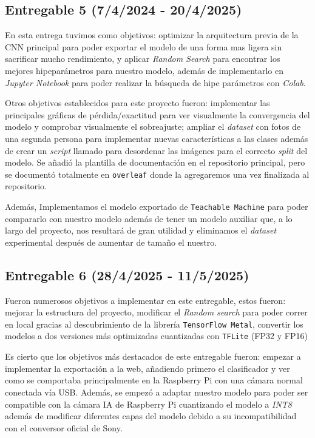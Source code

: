 \subsection{Entregable 5 (7/4/2024 - 20/4/2025)}
En esta entrega tuvimos como objetivos: optimizar la arquitectura previa de la CNN principal para poder exportar el modelo de una forma mas ligera sin sacrificar mucho rendimiento, y aplicar \textit{Random Search} para encontrar los mejores hipeparámetros para nuestro modelo, además de implementarlo en \textit{Jupyter Notebook} para poder realizar la búsqueda de hipe parámetros con \textit{Colab}. 

Otros objetivos establecidos para este proyecto fueron: implementar las principales gráficas de pérdida/exactitud para ver visualmente la convergencia del modelo y comprobar visualmente el sobreajuste; ampliar el \textit{dataset} con fotos de una segunda persona para implementar nuevas características a las clases además de crear un \textit{script} llamado para desordenar las imágenes para el correcto \textit{split} del modelo. Se añadió la plantilla de documentación en el repositorio principal, pero se documentó totalmente en \texttt{overleaf} donde la agregaremos una vez finalizada al repositorio.

Además, Implementamos el modelo exportado de \texttt{Teachable Machine} para poder compararlo con nuestro modelo además de tener un modelo auxiliar que, a lo largo del proyecto, nos resultará de gran utilidad y eliminamos el \textit{dataset} experimental después de aumentar de tamaño el nuestro.

\subsection{Entregable 6 (28/4/2025 - 11/5/2025)}
Fueron numerosos objetivos a implementar en este entregable, estos fueron: mejorar la estructura del proyecto, modificar el \textit{Random search} para poder correr en local gracias al descubrimiento de la librería \texttt{TensorFlow Metal}, convertir los modelos a dos versiones más optimizadas cuantizadas con \texttt{TFLite} (FP32 y FP16)

Es cierto que los objetivos más destacados de este entregable fueron: empezar a implementar la exportación a la web, añadiendo primero el clasificador y ver como se comportaba principalmente en la Raspberry Pi con una cámara normal conectada vía USB. Además, se empezó a adaptar nuestro modelo para poder ser compatible con la cámara IA de Raspberry Pi cuantizando el modelo a \textit{INT8} además de modificar diferentes capas del modelo debido a su incompatibilidad con el conversor oficial de Sony.


